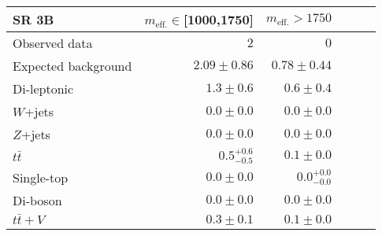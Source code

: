 \begin{tabular*}{\textwidth}{@{\extracolsep{\fill}}lrrrrr}
\toprule
\textbf{SR 3B} & $m_{\mathrm{eff.}}\in$[1000,1750] & $m_{\mathrm{eff.}}>1750$ \\
\midrule
Observed data          & $2$              & $0$                    \\
\midrule
Expected background         & $2.09 \pm 0.86$          & $0.78 \pm 0.44$              \\
\midrule
        Di-leptonic         & $1.3 \pm 0.6$          & $0.6 \pm 0.4$              \\
        $W$+jets         & $0.0 \pm 0.0$          & $0.0 \pm 0.0$              \\
        $Z$+jets         & $0.0 \pm 0.0$          & $0.0 \pm 0.0$              \\
        $t\bar{t}$         & $0.5_{-0.5}^{+0.6}$          & $0.1 \pm 0.0$              \\
        Single-top         & $0.0 \pm 0.0$          & $0.0_{-0.0}^{+0.0}$              \\
        Di-boson         & $0.0 \pm 0.0$          & $0.0 \pm 0.0$              \\
        $t\bar{t}+V$         & $0.3 \pm 0.1$          & $0.1 \pm 0.0$              \\


\bottomrule
\end{tabular*}




